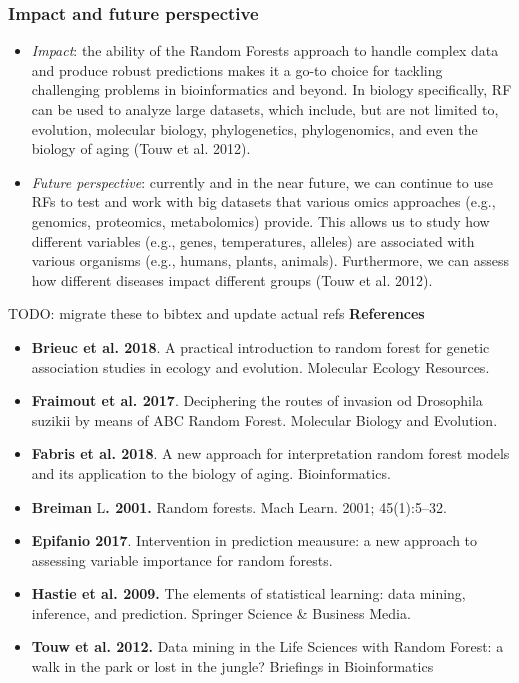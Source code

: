 \subsubsection{Impact and future perspective}

  \begin{itemize}
  \item
    \emph{Impact}: the ability of the Random Forests approach to
    handle complex data and produce robust predictions makes it a go-to
    choice for tackling challenging problems in bioinformatics and
    beyond. In biology specifically, RF can be used to analyze large
    datasets, which include, but are not limited to, evolution,
    molecular biology, phylogenetics, phylogenomics, and even the
    biology of aging (Touw et al. 2012).
  \item
    \emph{Future perspective}: currently and in the near future, we
    can continue to use RFs to test and work with big datasets that
    various omics approaches (e.g., genomics, proteomics, metabolomics)
    provide. This allows us to study how different variables (e.g.,
    genes, temperatures, alleles) are associated with various organisms
    (e.g., humans, plants, animals). Furthermore, we can assess how
    different diseases impact different groups (Touw et al. 2012).
  \end{itemize}


TODO: migrate these to bibtex and update actual refs
  \textbf{References}

  \begin{itemize}
  \item
    \textbf{Brieuc et al. 2018}. A practical introduction to random
    forest for genetic association studies in ecology and evolution.
    Molecular Ecology Resources.
  \item
    \textbf{Fraimout et al. 2017}. Deciphering the routes of invasion od
    Drosophila suzikii by means of ABC Random Forest. Molecular Biology
    and Evolution.
  \item
    \textbf{Fabris et al. 2018}. A new approach for interpretation
    random forest models and its application to the biology of aging.
    Bioinformatics.
  \item
    \textbf{Breiman} L\textbf{. 2001.} Random forests. Mach Learn. 2001;
    45(1):5--32.
  \item
    \textbf{Epifanio 2017}. Intervention in prediction meausure: a new
    approach to assessing variable importance for random forests.
  \item
    \textbf{Hastie et al. 2009.} The elements of statistical learning:
    data mining, inference, and prediction. Springer Science \& Business
    Media.
  \item
    \textbf{Touw et al. 2012.} Data mining in the Life Sciences with
    Random Forest: a walk in the park or lost in the jungle? Briefings
    in Bioinformatics
  \end{itemize}
